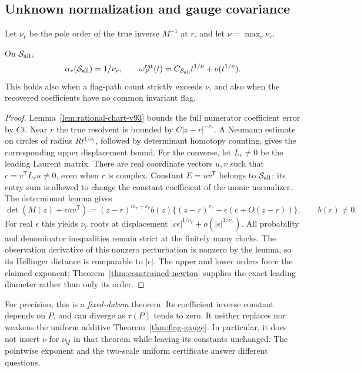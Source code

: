 \subsection{Unknown normalization and gauge covariance}
Let $\nu_r$ be the pole order of the true inverse $M^{-1}$ at $r$,
and let $\nu=\max_r\nu_r$.
\begin{corollary}
\label{cor:free-normalizer-v93}
On $\mathcal S_{\rm all}$,
\begin{equation}\label{eq:free-normalizer-v93}
 \alpha_r(\mathcal S_{\rm all})=1/\nu_r,
 \qquad \omega_P^{\rm rat}(t)
       =C_{\mathcal S_{\rm all}}t^{1/\nu}+o(t^{1/\nu}).
\end{equation}
This holds also when a flag-path count strictly exceeds $\nu$, and
also when the recovered coefficients have no common invariant flag.
\end{corollary}
\begin{proof}
Lemma~\ref{lem:rational-chart-v93} bounds the full numerator coefficient
error by $Ct$. Near $r$ the true resolvent is bounded by
$C|z-r|^{-\nu_r}$. A Neumann estimate on circles of radius
$R t^{1/\nu_r}$, followed by determinant homotopy counting, gives
the corresponding upper displacement bound.
For the converse, let $L_r\ne0$ be the leading Laurent matrix.
There are real coordinate vectors $u,v$ such that
$c=v^{\mathsf T}L_ru\ne0$, even when $r$ is complex. Constant
$E=uv^{\mathsf T}$ belongs to $\mathcal S_{\rm all}$; its entry sum
is allowed to change the constant coefficient of the monic normalizer.
The determinant lemma gives
\[
 \det(M(z)+\epsilon uv^{\mathsf T})
 = (z-r)^{m_r-\nu_r}b(z)
       \{(z-r)^{\nu_r}+\epsilon(c+O(z-r))\},
 \qquad b(r)\ne0.
\]
For real $\epsilon$ this yields $\nu_r$ roots at displacement
$|c\epsilon|^{1/\nu_r}+o(|\epsilon|^{1/\nu_r})$.
All probability and denominator inequalities remain strict at the
finitely many clocks. The observation derivative of this nonzero
perturbation is nonzero by the lemma, so its Hellinger distance is
comparable to $|\epsilon|$. The upper and lower orders force the
claimed exponent; Theorem~\ref{thm:constrained-newton} supplies the
exact leading diameter rather than only its order.
\end{proof}

For precision, this is a \emph{fixed-datum} theorem. Its coefficient
inverse constant depends on $P$, and can diverge as $\tau(P)$ tends
to zero. It neither replaces nor weakens the uniform additive
Theorem~\ref{thm:flag-gauge}. In particular, it does not insert
$\nu$ for $\nu_Q$ in that theorem while leaving its constants
unchanged. The pointwise exponent and the two-scale uniform certificate
answer different questions.

